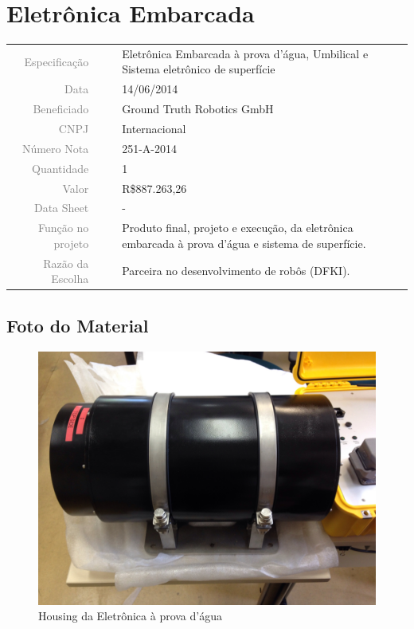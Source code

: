 \section{Eletrônica Embarcada}
\label{EEA}


\begin{table}[ht!]

	\begin{tabular}{r l|l p{12cm} }
		
		\textcolor{gray}{Especificação} &&& 	{Eletrônica Embarcada à prova d'água,
		Umbilical e Sistema eletrônico de superfície}\\
		\textcolor{gray}{Data} &&& 				{14/06/2014}\\
        \textcolor{gray}{Beneficiado} &&&		{Ground Truth Robotics GmbH} \\
        \textcolor{gray}{CNPJ} &&& 				{Internacional} \\
        \textcolor{gray}{Número Nota} &&& 		{251-A-2014} \\
		\textcolor{gray}{Quantidade} &&& 		{1} \\
		\textcolor{gray}{Valor} &&& 			{R\$887.263,26} \\
		\textcolor{gray}{Data Sheet} &&& 		{-} \\

		\textcolor{gray}{Função no projeto} &&& {Produto final, projeto e execução, da
		eletrônica embarcada à prova d'água e sistema de superfície.}
		\\
		\textcolor{gray}{Razão da Escolha} &&& {Parceira no desenvolvimento de robôs
		(DFKI).}
	\end{tabular}
\end{table}

\newpage

\subsection{Foto do Material}
\begin{figure}[H]
 \centering
 \includegraphics[width=1\columnwidth]{EEA/foto1.jpg}
 \caption{Housing da Eletrônica à prova d'água}
\end{figure}

